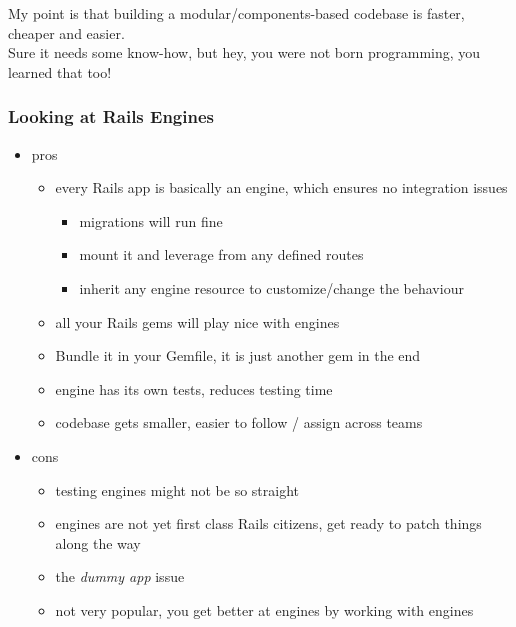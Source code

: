 \documentclass[compress]{beamer}
\begin{document}
\begin{frame}
  \begin{center}
    \huge My point is that building a modular/components-based codebase is faster, cheaper and easier.
    \\
    \small Sure it needs some know-how, but hey, you were not born programming, you learned that too!
  \end{center}
\end{frame}

\begin{frame}
\frametitle{Looking at Rails Engines}

\begin{itemize}[<+->]
  \item pros
    \begin{itemize}
      \item every Rails app is basically an engine, which ensures no integration issues
        \begin{itemize}
          \item migrations will run fine
          \item mount it and leverage from any defined routes
          \item inherit any engine resource to customize/change the behaviour
        \end{itemize}
      \item all your Rails gems will play nice with engines
      \item Bundle it in your Gemfile, it is just another gem in the end
      \item engine has its own tests, reduces testing time
      \item codebase gets smaller, easier to follow / assign across teams
    \end{itemize}
  \item cons
    \begin{itemize}
      \item testing engines might not be so straight
      \item engines are not yet first class Rails citizens, get ready to patch things along the way
      \item the \emph{dummy app} issue
      \item not very popular, you get better at engines by working with engines
    \end{itemize}
\end{itemize}
\end{frame}
\end{document}
